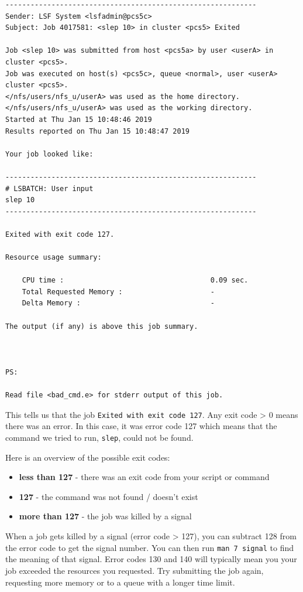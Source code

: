 \documentclass[11pt]{article}
\providecommand{\tightlist}{%
      \setlength{\itemsep}{0pt}\setlength{\parskip}{0pt}}
\begin{document}
    \begin{verbatim}
------------------------------------------------------------
Sender: LSF System <lsfadmin@pcs5c>
Subject: Job 4017581: <slep 10> in cluster <pcs5> Exited

Job <slep 10> was submitted from host <pcs5a> by user <userA> in cluster <pcs5>.
Job was executed on host(s) <pcs5c>, queue <normal>, user <userA> cluster <pcs5>.
</nfs/users/nfs_u/userA> was used as the home directory.
</nfs/users/nfs_u/userA> was used as the working directory.
Started at Thu Jan 15 10:48:46 2019
Results reported on Thu Jan 15 10:48:47 2019

Your job looked like:

------------------------------------------------------------
# LSBATCH: User input
slep 10
------------------------------------------------------------

Exited with exit code 127.

Resource usage summary:

    CPU time :                                   0.09 sec.
    Total Requested Memory :                     -
    Delta Memory :                               -

The output (if any) is above this job summary.



PS:

Read file <bad_cmd.e> for stderr output of this job.
\end{verbatim}

    This tells us that the job \texttt{Exited\ with\ exit\ code\ 127}. Any
exit code \textgreater{} 0 means there was an error. In this case, it
was error code 127 which means that the command we tried to run,
\texttt{slep}, could not be found.

Here is an overview of the possible exit codes:

\begin{itemize}
\tightlist
\item
  \textbf{less than 127} - there was an exit code from your script or
  command
\item
  \textbf{127} - the command was not found / doesn't exist
\item
  \textbf{more than 127} - the job was killed by a signal
\end{itemize}

When a job gets killed by a signal (error code \textgreater{} 127), you
can subtract 128 from the error code to get the signal number. You can
then run \texttt{man\ 7\ signal} to find the meaning of that signal.
Error codes 130 and 140 will typically mean you your job exceeded the
resources you requested. Try submitting the job again, requesting more
memory or to a queue with a longer time limit.
\end{document}
